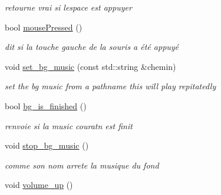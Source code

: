\begin{DoxyCompactItemize}
\begin{DoxyCompactList}\small\item\em retourne vrai si l\textquotesingle{}espace est appuyer \end{DoxyCompactList}\item 
\mbox{\label{class_fenetre_s_f_m_l_a6436b743eccfb9a7f2300fa9cd3fccad}} 
bool \mbox{\hyperlink{class_fenetre_s_f_m_l_a6436b743eccfb9a7f2300fa9cd3fccad}{mouse\+Pressed}} ()
\begin{DoxyCompactList}\small\item\em dit si la touche gauche de la souris a été appuyé \end{DoxyCompactList}\item 
\mbox{\label{class_fenetre_s_f_m_l_a10190311b69d6f2cd07fbd7564f887b3}} 
void \mbox{\hyperlink{class_fenetre_s_f_m_l_a10190311b69d6f2cd07fbd7564f887b3}{set\+\_\+bg\+\_\+music}} (const std\+::string \&chemin)
\begin{DoxyCompactList}\small\item\em set the bg music from a pathname this will play repitatedly \end{DoxyCompactList}\item 
\mbox{\label{class_fenetre_s_f_m_l_ad740f79245c4f70899278d7d56dca516}} 
bool \mbox{\hyperlink{class_fenetre_s_f_m_l_ad740f79245c4f70899278d7d56dca516}{bg\+\_\+is\+\_\+finished}} ()
\begin{DoxyCompactList}\small\item\em renvoie si la music couratn est finit \end{DoxyCompactList}\item 
\mbox{\label{class_fenetre_s_f_m_l_acc698eeb5f93898c43208f7cd3a46d3a}} 
void \mbox{\hyperlink{class_fenetre_s_f_m_l_acc698eeb5f93898c43208f7cd3a46d3a}{stop\+\_\+bg\+\_\+music}} ()
\begin{DoxyCompactList}\small\item\em comme son nom arrete la musique du fond \end{DoxyCompactList}\item 
\mbox{\label{class_fenetre_s_f_m_l_aa1f1a47cc25c814bbb1c42c01e350a6d}} 
void \mbox{\hyperlink{class_fenetre_s_f_m_l_aa1f1a47cc25c814bbb1c42c01e350a6d}{volume\+\_\+up}} ()

\end{DoxyCompactItemize}
